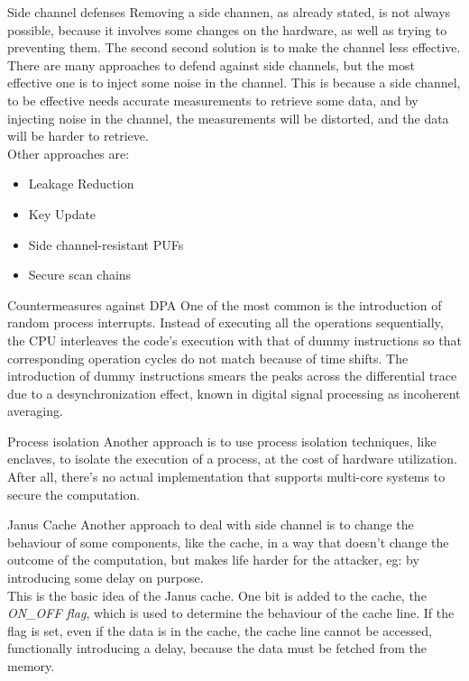 \begin{section}{Side channel defenses}
  Removing a side channen, as already stated, is not always possible, because it involves some
  changes on the hardware, as well as trying to preventing them. The second second solution is to
  make the channel less effective. There are many approaches to defend against side channels, but
  the most effective one is to inject some noise in the channel. This is because a side channel, to
  be effective needs accurate measurements to retrieve some data, and by injecting noise in the
  channel, the measurements will be distorted, and the data will be harder to retrieve.\\
  Other approaches are:
  \begin{itemize}
    \item Leakage Reduction
    \item Key Update
    \item Side channel-resistant PUFs
    \item Secure scan chains
  \end{itemize}
  \begin{subsection}{Countermeasures against DPA}
    One of the most common is the introduction of random process interrupts. Instead of executing
    all the operations sequentially, the CPU interleaves the code’s execution with that of dummy
    instructions so that corresponding operation cycles do not match because of time shifts. The
    introduction of dummy instructions smears the peaks across the differential trace due to a
    desynchronization effect, known in digital signal processing as incoherent averaging.
  \end{subsection}

  \begin{subsection}{Process isolation}
    Another approach is to use process isolation techniques, like enclaves, to isolate the
    execution of a process, at the cost of hardware utilization. After all, there's no actual
    implementation that supports multi-core systems to secure the computation.
  \end{subsection}

  \begin{subsection}{Janus Cache}
    Another approach to deal with side channel is to change the behaviour of some components, like
    the cache, in a way that doesn't change the outcome of the computation, but makes life harder
    for the attacker, eg: by introducing some delay on purpose.\\
    This is the basic idea of the Janus cache. One bit is added to the cache, the \textit{ON_OFF
    flag}, which is used to determine the behaviour of the cache line. If the flag is set, even if
    the data is in the cache, the cache line cannot be accessed, functionally introducing a delay,
    because the data must be fetched from the memory.\\


\end{subsection}
\end{section}
